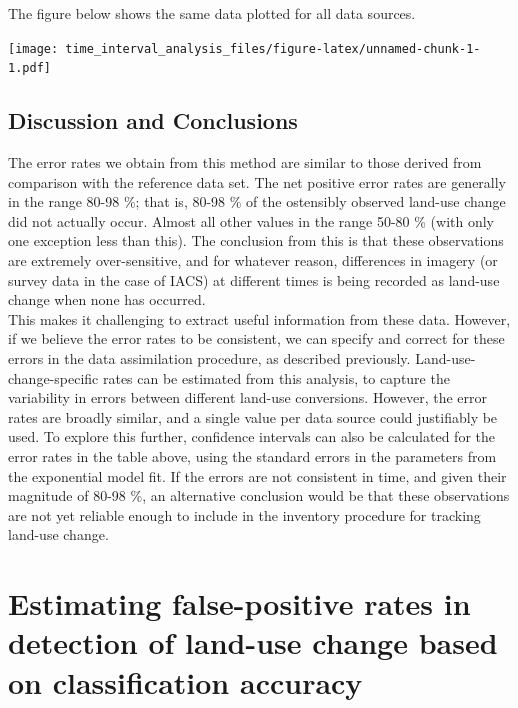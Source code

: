 \documentclass[
]{book}
\begin{document}
The figure below shows the same data plotted for all data sources.

\texttt{[image: time\_interval\_analysis\_files/figure-latex/unnamed-chunk-1-1.pdf]}

\hypertarget{discussion-and-conclusions}{%
\section{Discussion and Conclusions}\label{discussion-and-conclusions}}

The error rates we obtain from this method are similar to those derived from comparison with the reference data set. The net positive error rates are generally in the range 80-98 \%; that is, 80-98 \% of the ostensibly observed land-use change did not actually occur. Almost all other values in the range 50-80 \% (with only one exception less than this).
The conclusion from this is that these observations are extremely over-sensitive, and for whatever reason, differences in imagery (or survey data in the case of IACS) at different times is being recorded as land-use change when none has occurred.\\
This makes it challenging to extract useful information from these data.
However, if we believe the error rates to be consistent, we can specify and correct for these errors in the data assimilation procedure, as described previously.
Land-use-change-specific rates can be estimated from this analysis, to capture the variability in errors between different land-use conversions. However, the error rates are broadly similar, and a single value per data source could justifiably be used.
To explore this further, confidence intervals can also be calculated for the error rates in the table above, using the standard errors in the parameters from the exponential model fit.
If the errors are not consistent in time, and given their magnitude of 80-98 \%, an alternative conclusion would be that these observations are not yet reliable enough to include in the inventory procedure for tracking land-use change.

\hypertarget{estimating-false-positive-rates-in-detection-of-land-use-change-based-on-classification-accuracy}{%
\chapter{Estimating false-positive rates in detection of land-use change based on classification accuracy}\label{estimating-false-positive-rates-in-detection-of-land-use-change-based-on-classification-accuracy}}
\end{document}
